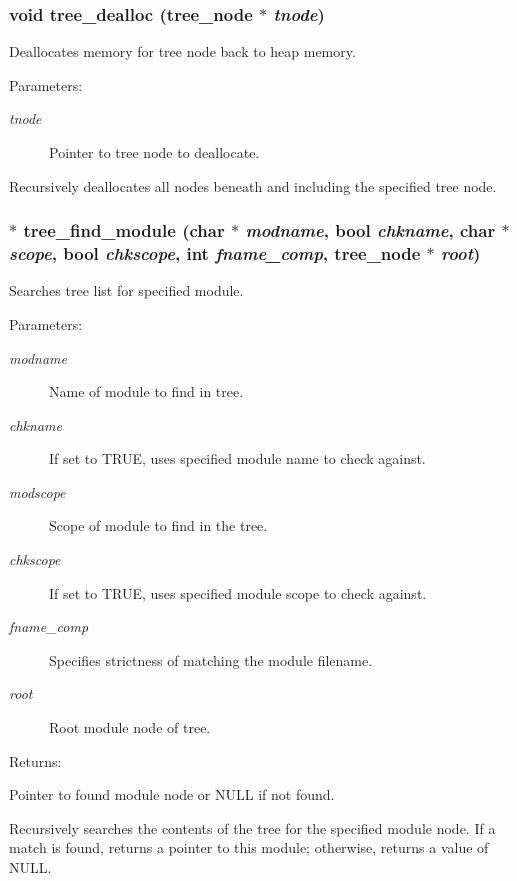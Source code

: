 \subsubsection{\setlength{\rightskip}{0pt plus 5cm}void tree\_\-dealloc ({\bf tree\_\-node} $\ast$ {\em tnode})}\label{tree_8h_a5}


Deallocates memory for tree node back to heap memory.

\begin{Desc}
\item[Parameters: ]\par
\begin{description}
\item[{\em 
tnode}]Pointer to tree node to deallocate.\end{description}
\end{Desc}
Recursively deallocates all nodes beneath and including the specified tree node. 
\subsubsection{$\ast$ tree\_\-find\_\-module (char $\ast$ {\em modname}, {\bf bool} {\em chkname}, char $\ast$ {\em scope}, {\bf bool} {\em chkscope}, int {\em fname\_\-comp}, {\bf tree\_\-node} $\ast$ {\em root})}\label{tree_8h_a4}


Searches tree list for specified module.

\begin{Desc}
\item[Parameters: ]\par
\begin{description}
\item[{\em 
modname}]Name of module to find in tree. \item[{\em 
chkname}]If set to TRUE, uses specified module name to check against. \item[{\em 
modscope}]Scope of module to find in the tree. \item[{\em 
chkscope}]If set to TRUE, uses specified module scope to check against. \item[{\em 
fname\_\-comp}]Specifies strictness of matching the module filename. \item[{\em 
root}]Root module node of tree. \end{description}
\end{Desc}
\begin{Desc}
\item[Returns: ]\par
Pointer to found module node or NULL if not found.\end{Desc}
Recursively searches the contents of the tree for the specified module node. If a match is found, returns a pointer to this module; otherwise, returns a value of NULL. 
